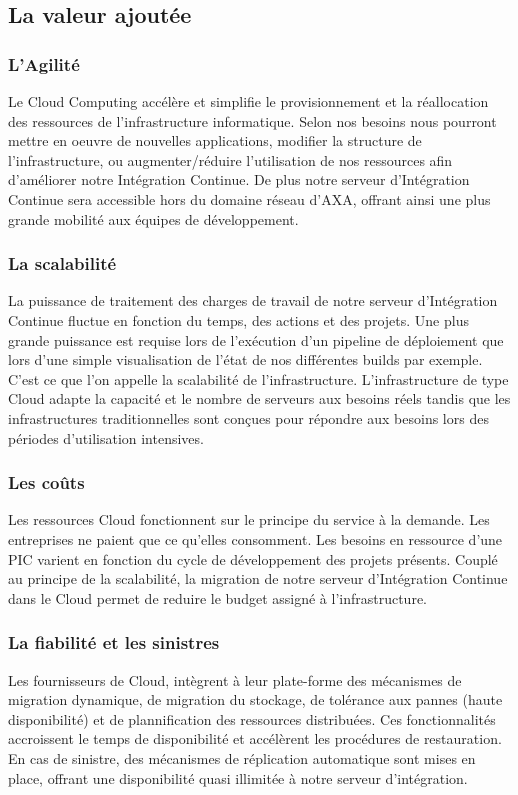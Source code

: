       \subsection{La valeur ajoutée}
        \subsubsection{L'Agilité}
        Le Cloud Computing accélère et simplifie le provisionnement et la réallocation des ressources de l'infrastructure informatique. Selon nos besoins nous pourront mettre en oeuvre de nouvelles applications, modifier la structure de l'infrastructure, ou augmenter/réduire l'utilisation de nos ressources afin d'améliorer notre Intégration Continue. De plus notre serveur d'Intégration Continue sera accessible hors du domaine réseau d'AXA, offrant ainsi une plus grande mobilité aux équipes de développement.

        \subsubsection{La scalabilité}
        La puissance de traitement des charges de travail de notre serveur d'Intégration Continue fluctue en fonction du temps, des actions et des projets. Une plus grande puissance est requise lors de l'exécution d'un pipeline de déploiement que lors d'une simple visualisation de l'état de nos différentes builds par exemple. C'est ce que l'on appelle la scalabilité de l'infrastructure. L'infrastructure de type Cloud adapte la capacité et le nombre de serveurs aux besoins réels tandis que les infrastructures traditionnelles sont conçues pour répondre aux besoins lors des périodes d'utilisation intensives.

        \subsubsection{Les coûts}
        Les ressources Cloud fonctionnent sur le principe du service à la demande. Les entreprises ne paient que ce qu'elles consomment. Les besoins en ressource d'une PIC varient en fonction du cycle de développement des projets présents. Couplé au principe de la scalabilité, la migration de notre serveur d'Intégration Continue dans le Cloud permet de reduire le budget assigné à l'infrastructure.

        \subsubsection{La fiabilité et les sinistres}
        Les fournisseurs de Cloud, intègrent à leur plate-forme des mécanismes de migration dynamique, de migration du stockage, de tolérance aux pannes (haute disponibilité) et de plannification des ressources distribuées. Ces fonctionnalités accroissent le temps de disponibilité et accélèrent les procédures de restauration. En cas de sinistre, des mécanismes de réplication automatique sont mises en place, offrant une disponibilité quasi illimitée à notre serveur d'intégration.

